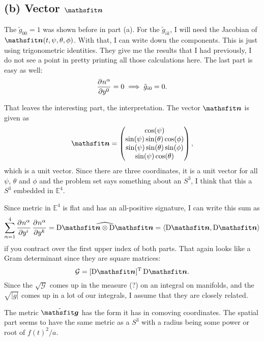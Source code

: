 \subsection*{(b) Vector $\tens n$}

The $\tilde g_{00} = 1$ was shown before in part (a). For the $\tilde g_{ik}$,
I will need the Jacobian of $\tens n(t, \psi, \theta, \phi)$. With that, I can
write down the components. This is just using trigonometric identities. They
give me the results that I had previously, I do not see a point in pretty
printing all those calculations here. The last part is easy as well:
\[
    \dpd{{n^\alpha}}{{y^0}} = 0 \implies \tilde g_{i0} = 0.
\]

That leaves the interesting part, the interpretation. The vector $\tens n$ is
given as
\[
    \tens n = \begin{pmatrix}
        \cos(\psi) \\
        \sin(\psi) \sin(\theta) \cos(\phi) \\
        \sin(\psi) \sin(\theta) \sin(\phi) \\
        \sin(\psi) \cos(\theta) \\
    \end{pmatrix},
\]
which is a unit vector. Since there are three coordinates, it is a unit vector
for all $\psi$, $\theta$ and $\phi$ and the problem set says something about an
$S^3$, I think that this a $S^3$ embedded in $\mathbb E^4$.

Since metric in $\mathbb E^4$ is flat and has an all-positive signature, I can
write this sum as
\[
    \sum_{\alpha = 1}^4 \dpd{{n^\alpha}}{{y^i}} \dpd{{n^\alpha}} {{y^k}} =
    \widehat{\Dif \tens n \otimes \Dif \tens n} = \inner{\Dif \tens n}{\Dif
    \tens n}
\]
if you contract over the first upper index of both parts. That again looks like
a Gram determinant since they are square matrices:
\[
    \mathcal G = [\Dif \tens n]^\mathrm T \Dif \tens n.
\]
Since the $\sqrt{\mathcal G}$ comes up in the measure (?) on an integral on
manifolds, and the $\sqrt{|g|}$ comes up in a lot of our integrals, I assume
that they are closely related.

The metric $\tilde{\tens g}$ has the form it has in comoving coordinates. The
spatial part seems to have the same metric as a $S^3$ with a radius being some
power or root of $f(t)^2/a$.

\IfFileExists{\bibliographyfile}{
    \printbibliography
}{}



